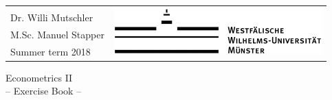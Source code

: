 \documentclass[captions=tableheading, 12pt, headings=small, parskip=half]{scrartcl}
\begin{document}
\begin{table}[H]
	\begin{tabular}{lr}
		& \multirow{4}{*}{\includegraphics[width = 8cm]{Code2/wwu_logo.png}}\\
		Dr. Willi Mutschler& \\
		M.Sc. Manuel Stapper & \\
		Summer term 2018 \hphantom{MMMMMMMMMMM}& 
	\end{tabular}
\end{table}
\vspace{1cm}
\begin{center}
	{\Large Econometrics II} \\
	-- Exercise Book --
\end{center}
\end{document}
